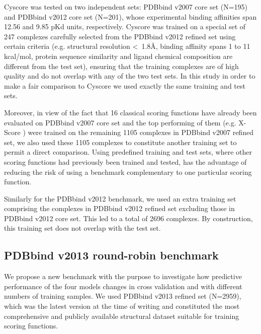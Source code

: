 Cyscore was tested on two independent sets: PDBbind v2007 core set (N=195) and PDBbind v2012 core set (N=201), whose experimental binding affinities span 12.56 and 9.85 pKd units, respectively. Cyscore was trained on a special set of 247 complexes carefully selected from the PDBbind v2012 refined set using certain criteria \citep{1372} (e.g. structural resolution \textless\ 1.8\AA, binding affinity spans 1 to 11 kcal/mol, protein sequence similarity and ligand chemical composition are different from the test set), ensuring that the training complexes are of high quality and do not overlap with any of the two test sets. In this study in order to make a fair comparison to Cyscore we used exactly the same training and test sets.

Moreover, in view of the fact that 16 classical scoring functions have already been evaluated \citep{1313} on PDBbind v2007 core set and the top performing of them (e.g. X-Score \citep{573}) were trained on the remaining 1105 complexes in PDBbind v2007 refined set, we also used these 1105 complexes to constitute another training set to permit a direct comparison. Using predefined training and test sets, where other scoring functions had previously been trained and tested, has the advantage of reducing the risk of using a benchmark complementary to one particular scoring function.

Similarly for the PDBbind v2012 benchmark, we used an extra training set comprising the complexes in PDBbind v2012 refined set excluding those in PDBbind v2012 core set. This led to a total of 2696 complexes. By construction, this training set does not overlap with the test set.

\subsection{PDBbind v2013 round-robin benchmark}

We propose a new benchmark with the purpose to investigate how predictive performance of the four models changes in cross validation and with different numbers of training samples. We used PDBbind v2013 refined set (N=2959), which was the latest version at the time of writing and constituted the most comprehensive and publicly available structural dataset suitable for training scoring functions.

